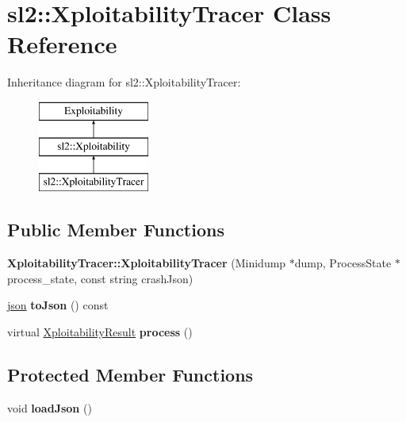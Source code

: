 \hypertarget{classsl2_1_1_xploitability_tracer}{}\section{sl2\+:\+:Xploitability\+Tracer Class Reference}
\label{classsl2_1_1_xploitability_tracer}
Inheritance diagram for sl2\+:\+:Xploitability\+Tracer\+:\begin{figure}[H]
\begin{center}
\leavevmode
\includegraphics[height=3.000000cm]{db/dcb/classsl2_1_1_xploitability_tracer}
\end{center}
\end{figure}
\subsection*{Public Member Functions}
\begin{DoxyCompactItemize}
\item 
\mbox{\label{classsl2_1_1_xploitability_tracer_a89e90a20f0211ea8fb6a4bd7194196e0}} 
{\bfseries Xploitability\+Tracer\+::\+Xploitability\+Tracer} (Minidump $\ast$dump, Process\+State $\ast$process\+\_\+state, const string crash\+Json)
\item 
\mbox{\label{classsl2_1_1_xploitability_tracer_a9e0ef383ce84e80a640ff6c51d903cb7}} 
\mbox{\hyperlink{classnlohmann_1_1basic__json}{json}} {\bfseries to\+Json} () const
\item 
\mbox{\label{classsl2_1_1_xploitability_tracer_aa4b69e4ac7e15134988bbb278f2b897b}} 
virtual \mbox{\hyperlink{classsl2_1_1_xploitability_result}{Xploitability\+Result}} {\bfseries process} ()
\end{DoxyCompactItemize}
\subsection*{Protected Member Functions}
\begin{DoxyCompactItemize}
\item 
\mbox{\label{classsl2_1_1_xploitability_tracer_a508ad55782c68a0d514f2ede69d52541}} 
void {\bfseries load\+Json} ()
\end{DoxyCompactItemize}
